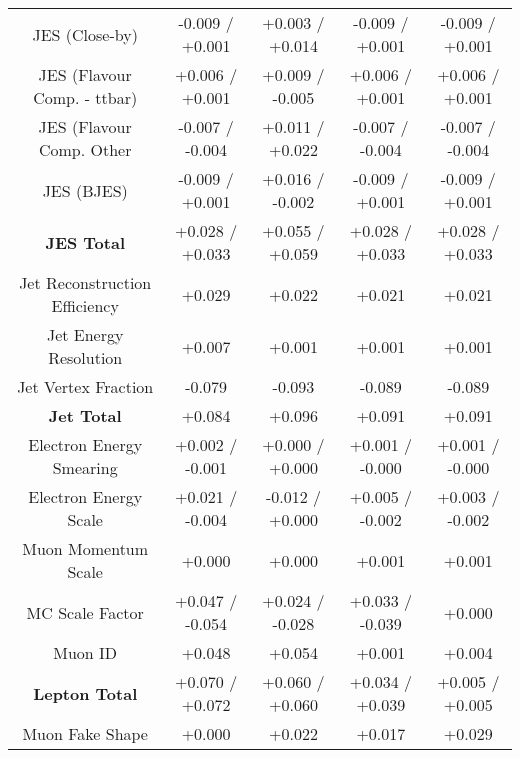 \begin{table}[htbp]
\begin{center}
\begin{tabular}{|c|c|c|c|c|}
JES (Close-by)                        &-0.009   / +0.001   & +0.003   / +0.014   & -0.009   / +0.001   & -0.009   / +0.001  \\
JES (Flavour Comp. - ttbar)           &+0.006   / +0.001   & +0.009   / -0.005   & +0.006   / +0.001   & +0.006   / +0.001  \\
JES (Flavour Comp. Other              &-0.007   / -0.004   & +0.011   / +0.022   & -0.007   / -0.004   & -0.007   / -0.004  \\
JES (BJES)                            &-0.009   / +0.001   & +0.016   / -0.002   & -0.009   / +0.001   & -0.009   / +0.001  \\
\hline
\textbf{JES Total}                    &+0.028   / +0.033   & +0.055   / +0.059   & +0.028   / +0.033   & +0.028   / +0.033  \\
\hline
Jet Reconstruction Efficiency         &+0.029              & +0.022              & +0.021              & +0.021             \\
Jet Energy Resolution                 &+0.007              & +0.001              & +0.001              & +0.001             \\
Jet Vertex Fraction                   &-0.079              & -0.093              & -0.089              & -0.089             \\
\hline
\textbf{Jet Total}                    &+0.084              & +0.096              & +0.091              & +0.091             \\
\hline
Electron Energy Smearing              &+0.002   / -0.001   & +0.000   / +0.000   & +0.001   / -0.000   & +0.001   / -0.000  \\
Electron Energy Scale                 &+0.021   / -0.004   & -0.012   / +0.000   & +0.005   / -0.002   & +0.003   / -0.002  \\
Muon Momentum Scale                   &+0.000              & +0.000              & +0.001              & +0.001             \\
MC Scale Factor                       &+0.047   / -0.054   & +0.024   / -0.028   & +0.033   / -0.039   & +0.000             \\
Muon ID                               &+0.048              & +0.054              & +0.001              & +0.004             \\
\hline
\textbf{Lepton Total}                 &+0.070   / +0.072   & +0.060   / +0.060   & +0.034   / +0.039   & +0.005   / +0.005  \\
\hline
Muon Fake Shape                       &+0.000              & +0.022              & +0.017              & +0.029             \\

\end{tabular}
\end{center}
\end{table}
